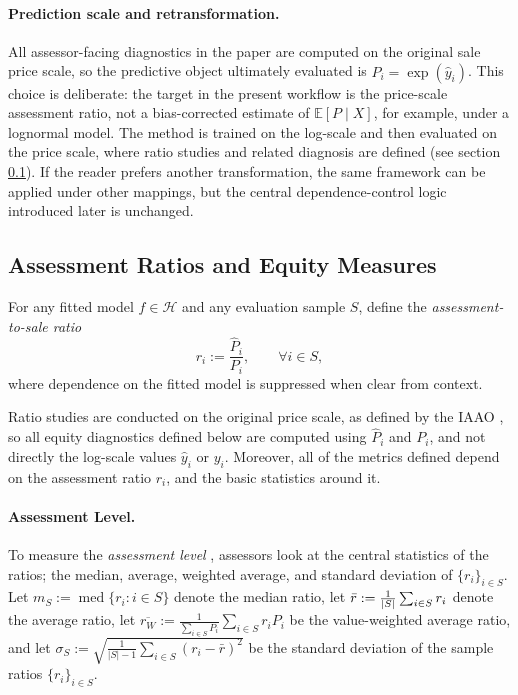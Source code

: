 \documentclass[12pt, draft]{article}
\theoremstyle{plain}
\theoremstyle{definition}
\newcommand{\E}{\mathbb{E}}
\newcommand{\1}{\mathbf{1}}
\renewcommand{\H}{\mathcal{H}}
\begin{document}
\paragraph{Prediction scale and retransformation.}
All assessor-facing diagnostics in the paper are computed on the original sale price scale, so the predictive object ultimately evaluated is \(\widehat P_i=\exp(\hat y_i)\). This choice is deliberate: the target in the present workflow is the price-scale assessment ratio, not a bias-corrected estimate of \(\E[P\mid X]\), for example, under a lognormal model.  The method is trained on the log-scale and then evaluated on the price scale, where ratio studies and related diagnosis are defined (see section \ref{subsec:equity_metrics}). If the reader prefers another transformation, the same framework can be applied under other mappings, but the central dependence-control logic introduced later is unchanged.


\subsection{Assessment Ratios and Equity Measures}
\label{subsec:equity_metrics}



For any fitted model $f\in \H$ and any evaluation sample $S$, define the \emph{assessment-to-sale ratio}
\begin{equation}
\label{eq:ratio_def}
r_i := \frac{\widehat P_i}{P_i} ,
\qquad \forall i\in S,
\end{equation}
where dependence on the fitted model is suppressed when clear from context. 

Ratio studies are conducted on the original price scale, as defined by the IAAO \cite{IAAO2025ExposureRatio}, so all equity diagnostics defined below are computed using $\hat P_i$ and $P_i$, and not directly the log-scale values $\hat y_i$ or $y_i$. Moreover, all of the metrics defined depend on the assessment ratio $r_i$, and the basic statistics around it. 

\paragraph{Assessment Level.} To measure the \textit{assessment level} \cite{IAAO2025ExposureRatio}, assessors look at the central statistics of the ratios; the median, average, weighted average, and standard deviation of $\{r_i\}_{i\in S}$.
Let
$
m_S := \operatorname{med}\{r_i: i\in S\}
$
denote the median ratio, let $\Bar{r}:= \frac{1}{|S|}\sum_{i\in S} r_i$ denote the average ratio, let $\overline{r_W}:=\frac{1}{\sum_{i\in S}P_i}\sum_{i\in S}r_i P_i$ be the value-weighted average ratio, and let $\sigma_S:=\sqrt{\frac{1}{|S|-1}\sum_{i\in S} (r_i - \bar r)^2}$ be the standard deviation of  the sample ratios $\{r_i\}_{i \in S}$.
\end{document}
